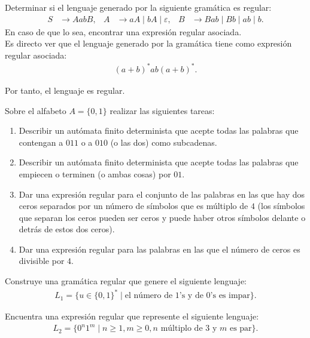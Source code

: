 \begin{ejercicio}
    Determinar si el lenguaje generado por la siguiente gramática es regular:
    \begin{align*}
        S &\to AabB, & A &\to aA \mid bA \mid \varepsilon, & B &\to Bab \mid Bb \mid ab \mid b.
    \end{align*}
    En caso de que lo sea, encontrar una expresión regular asociada.\\

    Es directo ver que el lenguaje generado por la gramática tiene como expresión regular asociada:
    \begin{align*}
        (a+b)^*ab(a+b)^*.
    \end{align*}

    Por tanto, el lenguaje es regular.
\end{ejercicio}

\begin{ejercicio}
    Sobre el alfabeto $A = \{0, 1\}$ realizar las siguientes tareas:
    \begin{enumerate}
        \item Describir un autómata finito determinista que acepte todas las palabras que contengan a $011$ o a $010$ (o las dos) como subcadenas.
        \item Describir un autómata finito determinista que acepte todas las palabras que empiecen o terminen (o ambas cosas) por $01$.
        \item Dar una expresión regular para el conjunto de las palabras en las que hay dos ceros separados por un número de símbolos que es múltiplo de $4$ (los símbolos que separan los ceros pueden ser ceros y puede haber otros símbolos delante o detrás de estos dos ceros).
        \item Dar una expresión regular para las palabras en las que el número de ceros es divisible por $4$.
    \end{enumerate}
\end{ejercicio}

\begin{ejercicio}
    Construye una gramática regular que genere el siguiente lenguaje:
    \begin{align*}
        L_1 = \{u \in \{0, 1\}^* \mid \text{el número de $1$'s y de $0$'s es impar}\}.
    \end{align*}
\end{ejercicio}

\begin{ejercicio}
    Encuentra una expresión regular que represente el siguiente lenguaje:
    \begin{align*}
        L_2 = \{0^n1^m \mid n \geq 1, m \geq 0, n \text{ múltiplo de } 3 \text{ y } m \text{ es par}\}.
    \end{align*}
\end{ejercicio}

